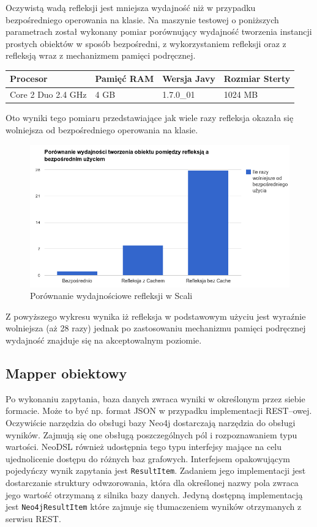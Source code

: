 \documentclass[brudnopis]{xmgr}
\begin{document}
Oczywistą wadą refleksji jest mniejsza wydajność niż w przypadku bezpośredniego operowania na klasie. Na maszynie testowej o poniższych parametrach został wykonany pomiar porównujący wydajność tworzenia instancji prostych obiektów w sposób bezpośredni, z wykorzystaniem refleksji oraz z refleksją wraz z mechanizmem pamięci podręcznej.

\begin{tabular}{|l|l|l|l|}
  \hline 
  \textbf{Procesor} & \textbf{Pamięć RAM} & \textbf{Wersja Javy} & \textbf{Rozmiar Sterty} \\
  \hline
  Core 2 Duo 2.4 GHz & 4 GB & 1.7.0\_01 & 1024 MB \\
  \hline
\end{tabular} 

Oto wyniki tego pomiaru przedstawiające jak wiele razy refleksja okazała się wolniejsza od bezpośredniego operowania na klasie.

\begin{figure}[H]
	\includegraphics[scale=0.6]{images/reflection-comparison.png}
	\caption{Porównanie wydajnościowe refleksji w Scali}
	\label{fig:reflection_comparison}
\end{figure}

Z powyższego wykresu wynika iż refleksja w podstawowym użyciu jest wyraźnie wolniejsza (aż 28 razy) jednak po zastosowaniu mechanizmu pamięci podręcznej wydajność znajduje się na akceptowalnym poziomie.

\subsection{Mapper obiektowy}

Po wykonaniu zapytania, baza danych zwraca wyniki w określonym przez siebie formacie. Może to być np. format JSON w przypadku implementacji REST--owej. Oczywiście narzędzia do obsługi bazy Neo4j dostarczają narzędzia do obsługi wyników. Zajmują się one obsługą poszczególnych pól i rozpoznawaniem typu wartości. NeoDSL również udostępnia tego typu interfejsy mające na celu ujednolicenie dostępu do różnych baz grafowych. Interfejsem opakowującym pojedyńczy wynik zapytania jest \texttt{ResultItem}. Zadaniem jego implementacji jest dostarczanie struktury odwzorowania, która dla określonej nazwy pola zwraca jego wartość otrzymaną z silnika bazy danych. Jedyną dostępną implementacją jest \texttt{Neo4jResultItem} które zajmuje się tłumaczeniem wyników otrzymanych z serwisu REST.
\end{document}
